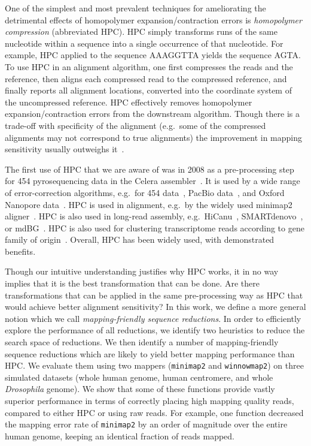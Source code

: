 \documentclass[
  11pt,
  twoside]{scrbook}
\begin{document}
One of the simplest and most prevalent techniques for ameliorating the detrimental effects of homopolymer expansion/contraction errors is \emph{homopolymer compression} (abbreviated HPC). HPC simply transforms runs of the same nucleotide within a sequence into a single occurrence of that nucleotide. For example, HPC applied to the sequence AAAGGTTA yields the sequence AGTA. To use HPC in an alignment algorithm, one first compresses the reads and the reference, then aligns each compressed read to the compressed reference, and finally reports all alignment locations, converted into the coordinate system of the uncompressed reference. HPC effectively removes homopolymer expansion/contraction errors from the downstream algorithm. Though there is a trade-off with specificity of the alignment (e.g.~some of the compressed alignments may not correspond to true alignments) the improvement in mapping sensitivity usually outweighs it~\autocite{liMinimap2PairwiseAlignment2018}.

The first use of HPC that we are aware of was in 2008 as a pre-processing step for 454 pyrosequencing data in the Celera assembler~\autocite{millerAggressiveAssemblyPyrosequencing2008}. It is used by a wide range of error-correction algorithms, e.g.~for 454 data~\autocite{braggFastAccurateErrorcorrection2012}, PacBio data~\autocite{auImprovingPacBioLong2012}, and Oxford Nanopore data~\autocite{sahlinErrorCorrectionEnables2021}. HPC is used in alignment, e.g.~by the widely used minimap2 aligner~\autocite{liMinimap2PairwiseAlignment2018}. HPC is also used in long-read assembly, e.g.~HiCanu~\autocite{nurkHiCanuAccurateAssembly2020}, SMARTdenovo~\autocite{liuSMARTdenovoNovoAssembler2021}, or mdBG~\autocite{ekimMinimizerspaceBruijnGraphs2021}. HPC is also used for clustering transcriptome reads according to gene family of origin~\autocite{sahlinNovoClusteringLongRead2020}. Overall, HPC has been widely used, with demonstrated benefits.

Though our intuitive understanding justifies why HPC works, it in no way implies that it is the best transformation that can be done. Are there transformations that can be applied in the same pre-processing way as HPC that would achieve better alignment sensitivity? In this work, we define a more general notion which we call \emph{mapping-friendly sequence reductions}. In order to efficiently explore the performance of all reductions, we identify two heuristics to reduce the search space of reductions. We then identify a number of mapping-friendly sequence reductions which are likely to yield better mapping performance than HPC. We evaluate them using two mappers (\texttt{minimap2} and \texttt{winnowmap2}) on three simulated datasets (whole human genome, human centromere, and whole \emph{Drosophila} genome). We show that some of these functions provide vastly superior performance in terms of correctly placing high mapping quality reads, compared to either HPC or using raw reads. For example, one function decreased the mapping error rate of \texttt{minimap2} by an order of magnitude over the entire human genome, keeping an identical fraction of reads mapped.
\end{document}
